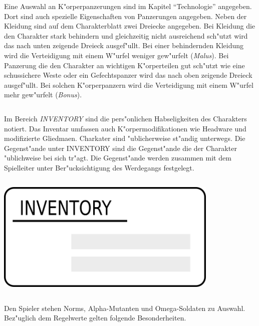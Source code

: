 Eine Auswahl an K"orperpanzerungen sind im Kapitel "`Technologie"' angegeben. Dort sind auch spezielle Eigenschaften von Panzerungen angegeben.  Neben der Kleidung sind auf dem Charakterblatt zwei Dreiecke angegeben. Bei Kleidung die den Charakter stark behindern und gleichzeitig nicht ausreichend sch"utzt wird das nach unten zeigende Dreieck ausgef"ullt. Bei einer behindernden Kleidung wird die Verteidigung mit einem W"urfel weniger gew"urfelt (\emph{Malus}). Bei Panzerung die den Charakter an wichtigen K"orperteilen gut sch"utzt wie eine schussichere Weste oder ein Gefechtspanzer wird das nach oben zeigende Dreieck ausgef"ullt. Bei solchen K"orperpanzern wird die Verteidigung mit einem W"urfel mehr gew"urfelt (\emph{Bonus}).

\begin{column}[l]{0.55}
    Im Bereich \emph{INVENTORY} sind die pers"onlichen Habseligkeiten des Charakters notiert. Das Inventar umfassen auch K"orpermodifikationen wie Headware und modifizierte Gliedma\3en. Charkater sind "ublicherweise st"andig unterwegs. Die Gegenst"ande unter INVENTORY sind die Gegenst"ande die der Charakter "ublichweise bei sich tr"agt. Die Gegenst"ande werden zusammen mit dem Spielleiter unter Ber"ucksichtigung des Werdegangs festgelegt.
\end{column}
\begin{column}[r]{0.45}
    \centering
    \includegraphics[width=0.80\textwidth]{images/character_inventory.png}
\end{column}
  

Den Spieler stehen Norms, Alpha-Mutanten und Omega-Soldaten zu Auswahl. Bez"uglich dem Regelwerte gelten folgende Besonderheiten.

